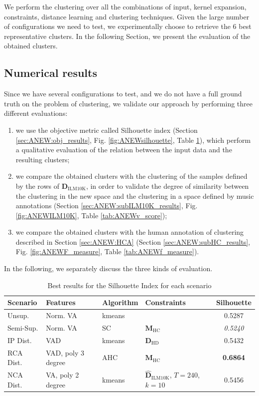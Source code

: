 We perform the clustering over all the combinations of input, kernel expansion, constraints, distance learning and clustering techniques. Given the large number of configurations we need to test, we experimentally choose to retrieve the $6$ best representative clusters. In the following Section, we present the evaluation of the obtained clusters.

\subsection{Numerical results}
Since we have several configurations to test, and we do not have a full ground truth on the problem of clustering, we validate our approach by performing three different evaluations:
\begin{enumerate}
\item we use the objective metric called Silhouette index (Section \ref{sec:ANEW:obj_results}, Fig. \ref{fig:ANEWsilhouette}, Table \ref{tab:ANEWsilhouette}),  which perform a qualitative evaluation of the relation between the input data and the resulting clusters;
\item we compare the obtained clusters with the clustering of the samples defined by the rows of $\mathbf{D}_{\text{ILM10K}}$, in order to validate the degree of similarity between the clustering in the new space and the clustering in a space defined by music annotations (Section \ref{sec:ANEW:subILM10K_results}, Fig. \ref{fig:ANEWILM10K}, Table \ref{tab:ANEWv_score});
\item we compare the obtained clusters with the human annotation of clustering described in Section \ref{sec:ANEW:HCA} (Section \ref{sec:ANEW:subHC_results}, Fig. \ref{fig:ANEWF_measure}, Table \ref{tab:ANEWf_measure}).
\end{enumerate}

In the following, we separately discuss the three kinds of evaluation.

\begin{table}[tb]
	\caption{Best results for the Silhouette Index for each scenario}
	\label{tab:ANEWsilhouette}
\begin{center}
  \bgroup
  \def\arraystretch{1.5}
\begin{tabular}{ ||l |l |l |l  |c||}
\hline
\hline
Scenario & Features & Algorithm & Constraints & Silhouette \\
\hline
\hline
Unsup. & Norm. VA & kmeans & & 0.5287 \\
\hline
Semi-Sup. & Norm. VA & SC & $\mathbf{{M}}_{\text{HC}}$ & {\color[HTML]{8E0000} \textit{0.5240}} \\
\hline
IP Dist. & VAD & kmeans & $\mathbf{{D}}_{\text{HD}}$  & 0.5432 \\
\hline
RCA Dist. & VAD, poly 3 degree & AHC & $\mathbf{{M}}_{\text{HC}}$ & {\color[HTML]{326B00}  \textbf{0.6864}} \\
\hline
NCA Dist. & VA, poly 2 degree & kmeans & $\mathbf{\hat{D}}_{\text{ILM10K}}$, $T=240$, $k=10$ & 0.5456 \\
\hline
\hline
\end{tabular}\quad
\egroup
\end{center}
\end{table}



